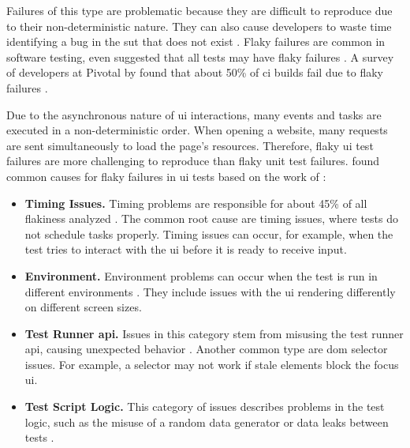 Failures of this type are problematic because they are difficult to reproduce due to their non-deterministic nature.
They can also cause developers to waste time identifying a bug in the \ac{sut} that does not exist \autocite{ziftci_-flake_2020}.
Flaky failures are common in software testing, \citeauthor*{harman_start-ups_2018} even suggested that all tests may have flaky failures \autocite{harman_start-ups_2018}.
A survey of developers at Pivotal by \citeauthor*{hilton_trade-offs_2017} found that about 50\% of \ac{ci} builds fail due to flaky failures \autocite{hilton_trade-offs_2017}.

Due to the asynchronous nature of \ac{ui} interactions, many events and tasks are executed in a non-deterministic order.
When opening a website, many requests are sent simultaneously to load the page's resources.
Therefore, flaky \ac{ui} test failures are more challenging to reproduce than flaky unit test failures.
 found common causes for flaky failures in \ac{ui} tests based on the work of \citeauthor*{luo_empirical_2014} \autocite{luo_empirical_2014,romano_empirical_2021}:

\begin{itemize}
	\item \textbf{Timing Issues.} Timing problems are responsible for about 45\% of all flakiness analyzed \autocite{romano_empirical_2021}.
	      The common root cause are timing issues, where tests do not schedule tasks properly.
	      Timing issues can occur, for example, when the test tries to interact with the \ac{ui} before it is ready to receive input.
	\item \textbf{Environment.} Environment problems can occur when the test is run in different environments \autocite{romano_empirical_2021}.
	      They include issues with the \ac{ui} rendering differently on different screen sizes.
	\item \textbf{Test Runner \acs{api}.} Issues in this category stem from misusing the test runner \ac{api}, causing unexpected behavior \autocite{romano_empirical_2021}.
	      Another common type are \ac{dom} selector issues.
	      For example, a selector may not work if stale elements block the focus \ac{ui}.
	\item \textbf{Test Script Logic.} This category of issues describes problems in the test logic, such as the misuse of a random data generator or data leaks between tests \autocite{romano_empirical_2021}.
\end{itemize}

